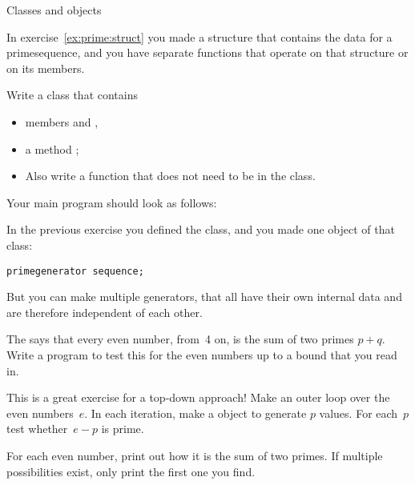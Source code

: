  {Classes and objects}

\prerequisite{\ref{sec:object}}

In exercise~\ref{ex:prime:struct} you made a structure that contains
the data for a primesequence, and you have separate functions that
operate on that structure or on its members.

\begin{exercise}
  \label{ex:prime:sequence}
  Write a class  that contains 
  \begin{itemize}
  \item members   and
    ,
  \item a method ;
  \item Also write a function  that does not need to be
    in the class.
  \end{itemize}

  Your main program should look as follows:
\end{exercise}

In the previous exercise you defined the  class, and
you made one object of that class:
\begin{verbatim}
primegenerator sequence;
\end{verbatim}
But you can make multiple generators, that all have their own internal
data and are therefore independent of each other.

\begin{exercise}
  \label{ex:goldbach:conj}
  The  says that every even number,
  from~4 on, is the sum of two primes $p+q$. Write a program to test this
  for the even numbers up to a bound that you read in.

  This is a great exercise for a top-down approach!
  Make an outer loop over the even numbers~$e$. In each iteration,
  make a  object to generate $p$ values.
  For each~$p$ test whether~$e-p$ is prime.

  For each even number, print out how it is the sum of two primes. If
  multiple possibilities exist, only print the first one you find.
\end{exercise}

